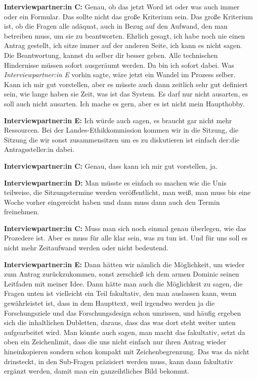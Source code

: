 \documentclass[a4paper,12pt,twoside]{scrreprt}
\begin{document}
\textbf{Interviewpartner:in C:} Genau, ob das jetzt Word ist oder was auch immer oder ein Formular. Das sollte nicht das große Kriterium sein. Das große Kriterium ist, ob die Fragen alle adäquat, auch in Bezug auf den Aufwand, den man betreiben muss, um sie zu beantworten. Ehrlich gesagt, ich habe noch nie einen Antrag gestellt, ich sitze immer auf der anderen Seite, ich kann es nicht sagen. Die Beantwortung, kannst du selber dir besser geben. Alle technischen Hindernisse müssen sofort ausgeräumt werden. Da bin ich sofort dabei. Was \textit{Interviewpartner:in E} vorhin sagte, wäre jetzt ein Wandel im Prozess selber. Kann ich mir gut vorstellen, aber es müsste auch dann zeitlich sehr gut definiert sein, wie lange haben sie Zeit, was ist das System. Es darf nur nicht ausarten, es soll auch nicht ausarten. Ich mache es gern, aber es ist nicht mein Haupthobby.

\textbf{Interviewpartner:in E:} Ich würde auch sagen, es braucht gar nicht mehr Ressourcen. Bei der Landes-Ethikkommission kommen wir in die Sitzung, die Sitzung die wir sonst zusammensitzen um es zu diskutieren ist einfach der:die Antragssteller:in dabei.

\textbf{Interviewpartner:in C:} Genau, dass kann ich mir gut vorstellen, ja.

\textbf{Interviewpartner:in D:} Man müsste es einfach so machen wie die Unis teilweise, die Sitzungstermine werden veröffentlicht, man weiß, man muss bis eine Woche vorher eingereicht haben und dann muss dann auch den Termin freinehmen.

\textbf{Interviewpartner:in C:} Muss man sich noch einmal genau überlegen, wie das Prozedere ist. Aber es muss für alle klar sein, was zu tun ist. Und für uns soll es nicht mehr Zeitaufwand werden oder nicht bedeutend.

\textbf{Interviewpartner:in E:} Dann hätten wir nämlich die Möglichkeit, um wieder zum Antrag zurückzukommen, sonst zerschieß ich dem armen Dominic seinen Leitfaden mit meiner Idee. Dann hätte man auch die Möglichkeit zu sagen, die Fragen unten ist vielleicht ein Teil fakultativ, den man auslassen kann, wenn gewährleistet ist, dass in dem Haupttext, weil irgendwo werden ja die Forschungsziele und das Forschungsdesign schon umrissen, und häufig ergeben sich die inhaltlichen Dubletten, daraus, dass das was dort steht weiter unten aufgearbeitet wird. Man könnte auch sagen, man macht das fakultativ, setzt da oben ein Zeichenlimit, dass die uns nicht einfach nur ihren Antrag wieder hineinkopieren sondern schon kompakt mit Zeichenbegrenzung. Das was da nicht drinsteckt, in den Sub-Fragen präzisiert werden muss, kann dann fakultativ ergänzt werden, damit man ein ganzeihtliches Bild bekommt.
\end{document}
